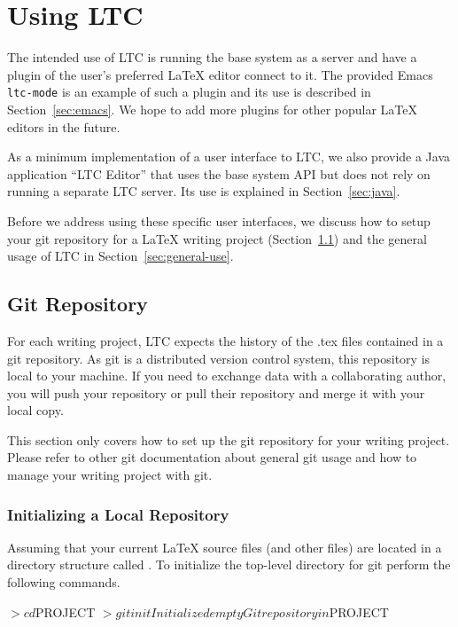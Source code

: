 \chapter{Using LTC}

The intended use of LTC is running the base system as a server and have a plugin of the user's preferred LaTeX editor connect to it.  The provided Emacs \texttt{ltc-mode} is an example of such a plugin and its use is described in Section~\ref{sec:emacs}.  We hope to add more plugins for other popular LaTeX editors in the future.

As a minimum implementation of a user interface to LTC, we also provide a Java application ``LTC Editor'' that uses the base system API but does not rely on running a separate LTC server.  Its use is explained in Section~\ref{sec:java}.

Before we address using these specific user interfaces, we discuss how to setup your git repository for a LaTeX writing project (Section~\ref{sec:git-use}) and the general usage of LTC in Section~\ref{sec:general-use}.

\section{Git Repository} \label{sec:git-use}

For each writing project, LTC expects the history of the .tex files contained in a git repository.  As git is a distributed version control system, this repository is local to your machine.  If you need to exchange data with a collaborating author, you will push your repository or pull their repository and merge it with your local copy.

This section only covers how to set up the git repository for your writing project.  Please refer to other git documentation about general git usage and how to manage your writing project with git.

\subsection{Initializing a Local Repository}

Assuming that your current LaTeX source files (and other files) are located in a directory structure called .  To initialize the top-level directory for git perform the following commands.
\begin{CodeVerbatim}
$> cd $PROJECT
$> git init 
Initialized empty Git repository in $PROJECT
\end{CodeVerbatim}

